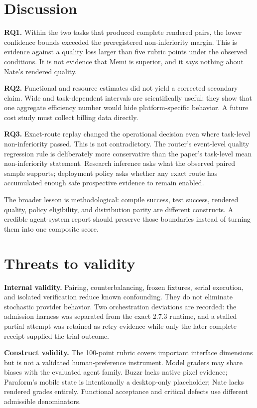 \documentclass[9pt,twocolumn]{extarticle}
\newcommand{\RQ}[1]{\textbf{RQ#1}}
\begin{document}
\section{Discussion}

\textbf{\RQ{1}.} Within the two tasks that produced complete rendered pairs,
the lower confidence bounds exceeded the preregistered non-inferiority margin.
This is evidence against a quality loss larger than five rubric points under
the observed conditions. It is not evidence that Memi is superior, and it says
nothing about Nate's rendered quality.

\textbf{\RQ{2}.} Functional and resource estimates did not yield a corrected
secondary claim. Wide and task-dependent intervals are scientifically useful:
they show that one aggregate efficiency number would hide platform-specific
behavior. A future cost study must collect billing data directly.

\textbf{\RQ{3}.} Exact-route replay changed the operational decision even where
task-level non-inferiority passed. This is not contradictory. The router's
event-level quality regression rule is deliberately more conservative than the
paper's task-level mean non-inferiority statement. Research inference asks what
the observed paired sample supports; deployment policy asks whether any exact
route has accumulated enough safe prospective evidence to remain enabled.

The broader lesson is methodological: compile success, test success, rendered
quality, policy eligibility, and distribution parity are different constructs.
A credible agent-system report should preserve those boundaries instead of
turning them into one composite score.

\section{Threats to validity}

\textbf{Internal validity.} Pairing, counterbalancing, frozen fixtures, serial
execution, and isolated verification reduce known confounding. They do not
eliminate stochastic provider behavior. Two orchestration deviations are
recorded: the admission harness was separated from the exact 2.7.3 runtime, and
a stalled partial attempt was retained as retry evidence while only the later
complete receipt supplied the trial outcome.

\textbf{Construct validity.} The 100-point rubric covers important interface
dimensions but is not a validated human-preference instrument. Model graders
may share biases with the evaluated agent family. Buzzr lacks native pixel
evidence; Paraform's mobile state is intentionally a desktop-only placeholder;
Nate lacks rendered grades entirely. Functional acceptance and critical
defects use different admissible denominators.
\end{document}
